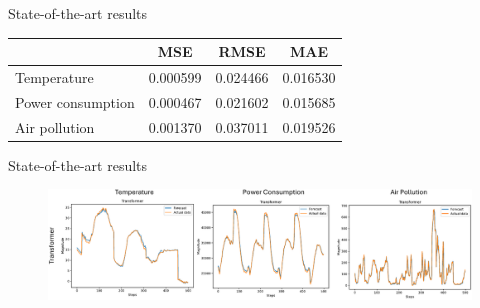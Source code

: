 \documentclass[aspectratio=16 9,10pt]{beamer}
\begin{document}
\begin{frame}{State-of-the-art results}
\begin{table}
\centering
\begin{tabular}{@{}lccc@{}}
\toprule
\textbf{}               & \hspace{0.6cm} \textbf{MSE} & \textbf{RMSE} & \textbf{MAE} \\ \midrule
Temperature           & \hspace{0.6cm} 0.000599     & \hspace{1cm} 0.024466     \hspace{1cm} & 0.016530     \\
Power consumption       & \hspace{0.6cm} 0.000467     & 0.021602      & 0.015685     \\
Air pollution           & \hspace{0.6cm} 0.001370     & 0.037011      & 0.019526     \\ \bottomrule
\end{tabular}
\end{table}

\end{frame}

\begin{frame}{State-of-the-art results}
\begin{figure}[]
	\begin{center}
	\includegraphics[width=1\textwidth, height=0.8\textheight, keepaspectratio]{trans.pdf}
	\end{center}
\end{figure}

\end{frame}
\end{document}
